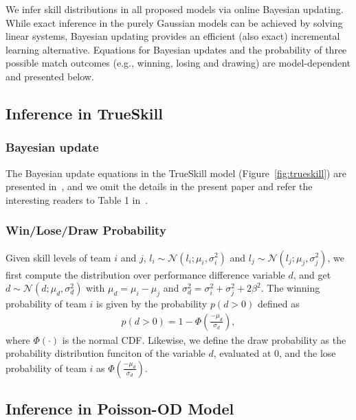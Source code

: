 \label{sec:inference}

We infer skill distributions in all proposed models via
online Bayesian updating.  While exact inference in the purely Gaussian
models can be achieved by solving linear systems, Bayesian
updating provides an efficient (also exact) incremental learning alternative.
Equations for Bayesian updates and the probability of three possible match outcomes (e.g., winning, losing and drawing) are
model-dependent and presented below.

\subsection{Inference in TrueSkill}

\subsubsection{Bayesian update}
The Bayesian update equations in the TrueSkill model
(Figure~\ref{fig:trueskill}) are presented
in~\cite{herbrich06569}, and we omit the details in the present paper and refer the interesting readers to Table 1 in~\cite{herbrich06569}. 

\subsubsection{Win/Lose/Draw Probability} 
\label{sec:winProbabilityTrueSkill}
Given skill levels of team $i$ and $j$, $l_i\sim\mathcal{N}(l_i;\mu_i,\sigma_i^2)$ and
$l_j\sim\mathcal{N}(l_j;\mu_j,\sigma_j^2)$, we first compute the
distribution over performance difference variable $d$, and get
$d\sim\mathcal{N}(d;\mu_d,\sigma_d^2)$ with $\mu_d = \mu_i - \mu_j$
and $\sigma_d^2 = \sigma_i^2 + \sigma_j^2+2\beta^2$. The winning
probability of team $i$ is given by the probability $p(d>0)$ defined as
\begin{align}
  p(d>0) = 1 - \Phi\left(\frac{-\mu_d}{\sigma_d}\right),
\end{align}
where $\Phi(\cdot)$ is the normal CDF. Likewise, we define the draw probability as the probability distribution funciton of the variable $d$, evaluated at 0, and the lose probability of team $i$ as $\Phi\left(\frac{-\mu_d}{\sigma_d}\right)$.

\subsection{Inference in Poisson-OD Model}
\label{sec:PoissonInference}

